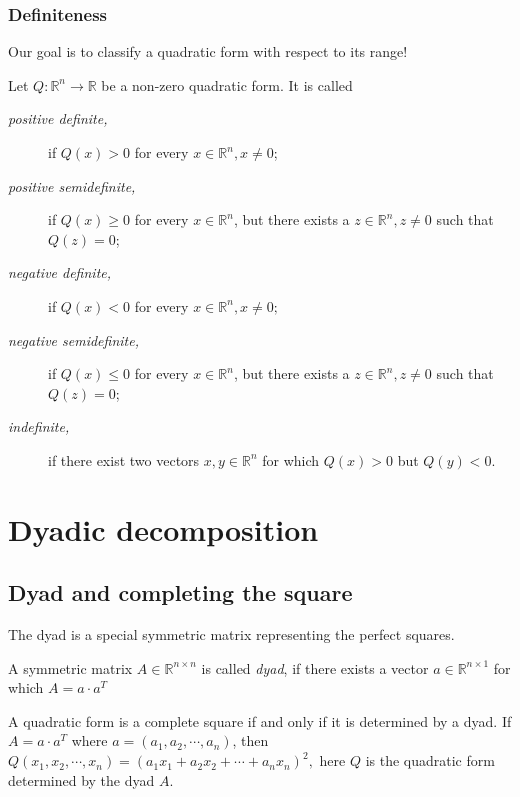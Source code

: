 \begin{frame}
    \frametitle{Definiteness}
    Our goal is to classify a quadratic form with respect to its range!
    \begin{definition}
        Let $Q:\mathbb{R}^n\to\mathbb{R}$ be a non-zero quadratic form. It is called
        \begin{description}
            \item[\emph{positive definite,}] if $Q\left( x \right)>0$ for every $x\in\mathbb{R}^n,x\neq 0$;
        \item[\emph{positive semidefinite,}] if $ Q\left( x \right)\geq 0$ for every $x\in\mathbb{R}^n$,
                but there exists a $z\in\mathbb{R}^n, z\neq 0$ such that $Q\left( z \right)=0$;
            \item[\emph{negative definite,}] if $ Q\left( x \right)<0$ for every $x\in\mathbb{R}^n,x\neq 0;$
            \item[\emph{negative semidefinite,}] if $ Q\left( x \right)\leq 0$ for every $x\in\mathbb{R}^n$,
                but there exists a $z\in\mathbb{R}^n, z\neq 0$ such that $Q\left( z \right)=0$;
            \item[\emph{indefinite,}] if there exist two vectors $x,y\in\mathbb{R}^n$ for which
                $Q\left( x \right)>0$ but $Q\left( y \right)<0$.
        \end{description}
    \end{definition}
\end{frame}
\section{Dyadic decomposition}
\subsection{Dyad and completing the square}
\begin{frame}
    The dyad is a special symmetric matrix representing the perfect squares.
    \begin{definition}
        A symmetric matrix $A\in\mathbb{R}^{n\times n}$ is called \alert{\emph{dyad}}, 
        if there exists a vector
        $a\in\mathbb{R}^{n\times 1}$ for which
        \(
            A=a\cdot a^T
        \)
    \end{definition}
    \begin{theorem}
        A quadratic form is a complete square if and only if it is determined by a dyad.
        If $A=a\cdot a^T$ where $a=\left( a_1,a_2,\cdots,a_n \right)$, then
          \(
             Q\left( x_1,x_2,\cdots,x_n \right)=
              \left( a_1x_1+a_2x_2+\cdots+a_nx_n \right)^2,
          \)
        here $Q$ is the quadratic form determined by the dyad $A$.
    \end{theorem}
\end{frame}
